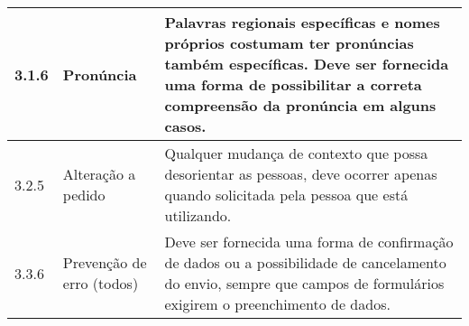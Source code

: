 \begin{appendices}
{\begin{minipage}{\linewidth}
{\begin{tabular}{|l|l|p{400px}|}
    3.1.6 &
      Pronúncia & Palavras regionais específicas e nomes próprios costumam ter pronúncias também específicas. Deve ser fornecida uma forma de possibilitar a correta compreensão da pronúncia em alguns casos. \\ \hline
    3.2.5 &
      Alteração a pedido & Qualquer mudança de contexto que possa desorientar as pessoas, deve ocorrer apenas quando solicitada pela pessoa que está utilizando. \\ \hline
    3.3.6 &
      Prevenção de erro (todos) & Deve ser fornecida uma forma de confirmação de dados ou a possibilidade de cancelamento do envio, sempre que campos de formulários exigirem o preenchimento de dados. \\ \hline

\end{tabular}
}
\label{Diretrizes nível AAA}

\end{minipage}

}


\end{appendices}